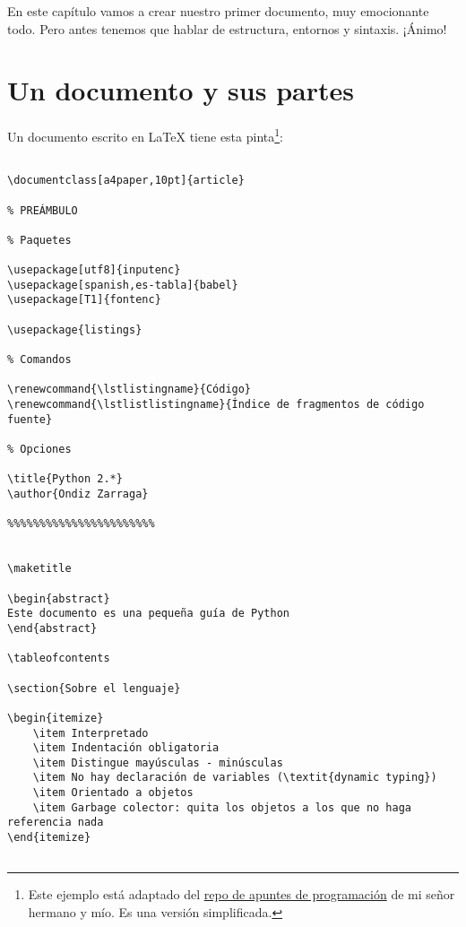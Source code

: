 En este capítulo vamos a crear nuestro primer documento, muy
emocionante todo. Pero antes tenemos que hablar de estructura,
entornos y sintaxis. ¡Ánimo!

\section{Un documento y sus partes}\label{un-documento-y-sus-partes}

Un documento escrito en LaTeX tiene esta pinta\footnote{Este ejemplo
  está adaptado del
  \href{https://github.com/ekaitz-zarraga/programming-notes}{repo de
  apuntes de programación} de mi señor hermano y mío. Es una versión
  simplificada.}:

\begin{lstlisting}[language={[latex]tex}, caption={Ejemplo de documento escrito con \LaTeX}]

\documentclass[a4paper,10pt]{article}

% PREÁMBULO 

% Paquetes

\usepackage[utf8]{inputenc}
\usepackage[spanish,es-tabla]{babel}
\usepackage[T1]{fontenc}

\usepackage{listings}

% Comandos

\renewcommand{\lstlistingname}{Código}
\renewcommand{\lstlistlistingname}{Índice de fragmentos de código fuente}

% Opciones

\title{Python 2.*}
\author{Ondiz Zarraga}

%%%%%%%%%%%%%%%%%%%%%%%


\maketitle

\begin{abstract}
Este documento es una pequeña guía de Python 
\end{abstract}

\tableofcontents

\section{Sobre el lenguaje}

\begin{itemize}
    \item Interpretado
    \item Indentación obligatoria
    \item Distingue mayúsculas - minúsculas
    \item No hay declaración de variables (\textit{dynamic typing})
    \item Orientado a objetos  
    \item Garbage colector: quita los objetos a los que no haga referencia nada
\end{itemize}


\end{lstlisting}

